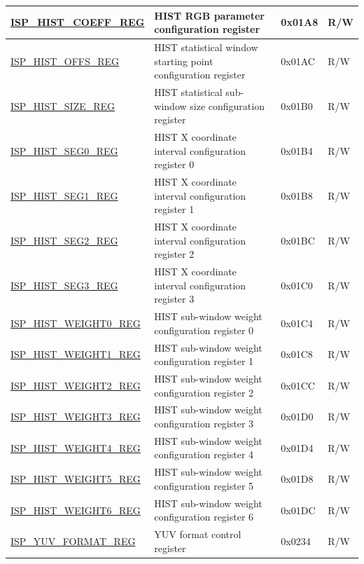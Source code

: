 \begin{longtable}{ | p{6cm} | p{7.2cm} | p{1.3cm} | p{1cm} | }
\hyperref[regdesc:ISPHISTCOEFFREG]{ISP\_HIST\_COEFF\_REG} & HIST RGB parameter configuration register & 0x01A8 & R/W \\ \hline
\hyperref[regdesc:ISPHISTOFFSREG]{ISP\_HIST\_OFFS\_REG} & HIST statistical window starting point configuration register & 0x01AC & R/W \\ \hline
\hyperref[regdesc:ISPHISTSIZEREG]{ISP\_HIST\_SIZE\_REG} & HIST statistical sub-window size configuration register & 0x01B0 & R/W \\ \hline
\hyperref[regdesc:ISPHISTSEG0REG]{ISP\_HIST\_SEG0\_REG} & HIST X coordinate interval configuration register 0 & 0x01B4 & R/W \\ \hline
\hyperref[regdesc:ISPHISTSEG1REG]{ISP\_HIST\_SEG1\_REG} & HIST X coordinate interval configuration register 1 & 0x01B8 & R/W \\ \hline
\hyperref[regdesc:ISPHISTSEG2REG]{ISP\_HIST\_SEG2\_REG} & HIST X coordinate interval configuration register 2 & 0x01BC & R/W \\ \hline
\hyperref[regdesc:ISPHISTSEG3REG]{ISP\_HIST\_SEG3\_REG} & HIST X coordinate interval configuration register 3 & 0x01C0 & R/W \\ \hline
\hyperref[regdesc:ISPHISTWEIGHT0REG]{ISP\_HIST\_WEIGHT0\_REG} & HIST sub-window weight configuration register 0 & 0x01C4 & R/W \\ \hline
\hyperref[regdesc:ISPHISTWEIGHT1REG]{ISP\_HIST\_WEIGHT1\_REG} & HIST sub-window weight configuration register 1 & 0x01C8 & R/W \\ \hline
\hyperref[regdesc:ISPHISTWEIGHT2REG]{ISP\_HIST\_WEIGHT2\_REG} & HIST sub-window weight configuration register 2 & 0x01CC & R/W \\ \hline
\hyperref[regdesc:ISPHISTWEIGHT3REG]{ISP\_HIST\_WEIGHT3\_REG} & HIST sub-window weight configuration register 3 & 0x01D0 & R/W \\ \hline
\hyperref[regdesc:ISPHISTWEIGHT4REG]{ISP\_HIST\_WEIGHT4\_REG} & HIST sub-window weight configuration register 4 & 0x01D4 & R/W \\ \hline
\hyperref[regdesc:ISPHISTWEIGHT5REG]{ISP\_HIST\_WEIGHT5\_REG} & HIST sub-window weight configuration register 5 & 0x01D8 & R/W \\ \hline
\hyperref[regdesc:ISPHISTWEIGHT6REG]{ISP\_HIST\_WEIGHT6\_REG} & HIST sub-window weight configuration register 6 & 0x01DC & R/W \\ \hline
\hyperref[regdesc:ISPYUVFORMATREG]{ISP\_YUV\_FORMAT\_REG} & YUV format control register & 0x0234 & R/W \\ \hline

\end{longtable}
